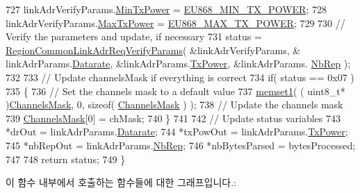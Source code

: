 \begin{DoxyCode}
727     linkAdrVerifyParams.\mbox{\hyperlink{structs_region_common_link_adr_req_verify_params_afe7bf10e9fadd8be6beb31e8b91a1ba2}{MinTxPower}} = \mbox{\hyperlink{group___r_e_g_i_o_n_e_u868_gab935a0225d447579203239740e33c72f}{EU868\_MIN\_TX\_POWER}};
728     linkAdrVerifyParams.\mbox{\hyperlink{structs_region_common_link_adr_req_verify_params_a118829b26fb7d913d4202d5d06356a95}{MaxTxPower}} = \mbox{\hyperlink{group___r_e_g_i_o_n_e_u868_ga39e338c7f8454f594302811f61d9560d}{EU868\_MAX\_TX\_POWER}};
729 
730     \textcolor{comment}{// Verify the parameters and update, if necessary}
731     status = \mbox{\hyperlink{group___r_e_g_i_o_n_c_o_m_m_o_n_ga2c87f98f09793dc7fa63a9801feeed73}{RegionCommonLinkAdrReqVerifyParams}}( &linkAdrVerifyParams, &
      linkAdrParams.\mbox{\hyperlink{structs_region_common_link_adr_params_ae2f6080f3aa0e9485c55513ca56bb24d}{Datarate}}, &linkAdrParams.\mbox{\hyperlink{structs_region_common_link_adr_params_a037b4f849fa8ed4aa1d3c58aef2b28ec}{TxPower}}, &linkAdrParams.
      \mbox{\hyperlink{structs_region_common_link_adr_params_a3b99538671d86dbfe2f6754ce6f9577a}{NbRep}} );
732 
733     \textcolor{comment}{// Update channelsMask if everything is correct}
734     \textcolor{keywordflow}{if}( status == 0x07 )
735     \{
736         \textcolor{comment}{// Set the channels mask to a default value}
737         \mbox{\hyperlink{utilities_8c_a272ed6d691263d9762c98ed720b1fa3a}{memset1}}( ( uint8\_t* )\mbox{\hyperlink{_region_e_u868_8c_a2188957b5ca6af8092154d7ccbfa5757}{ChannelsMask}}, 0, \textcolor{keyword}{sizeof}( 
      \mbox{\hyperlink{_region_e_u868_8c_a2188957b5ca6af8092154d7ccbfa5757}{ChannelsMask}} ) );
738         \textcolor{comment}{// Update the channels mask}
739         \mbox{\hyperlink{_region_e_u868_8c_a2188957b5ca6af8092154d7ccbfa5757}{ChannelsMask}}[0] = chMask;
740     \}
741 
742     \textcolor{comment}{// Update status variables}
743     *drOut = linkAdrParams.\mbox{\hyperlink{structs_region_common_link_adr_params_ae2f6080f3aa0e9485c55513ca56bb24d}{Datarate}};
744     *txPowOut = linkAdrParams.\mbox{\hyperlink{structs_region_common_link_adr_params_a037b4f849fa8ed4aa1d3c58aef2b28ec}{TxPower}};
745     *nbRepOut = linkAdrParams.\mbox{\hyperlink{structs_region_common_link_adr_params_a3b99538671d86dbfe2f6754ce6f9577a}{NbRep}};
746     *nbBytesParsed = bytesProcessed;
747 
748     \textcolor{keywordflow}{return} status;
749 \}
\end{DoxyCode}
이 함수 내부에서 호출하는 함수들에 대한 그래프입니다.\+:
\mbox{\label{group___r_e_g_i_o_n_e_u868_ga4325b111d5f14ddc4b33f5e827a8986e}} 
